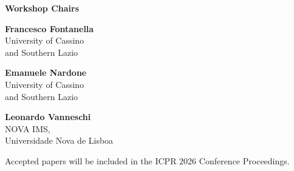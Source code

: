 \documentclass[a4paper,11pt]{article}
\begin{document}
\vspace{0.2cm}

\begin{center}
{\Large \textbf{\color{sage!60!black}Workshop Chairs}}
\end{center}
\vspace{0.2cm}

\noindent
\begin{minipage}{0.33\textwidth}
\textbf{Francesco Fontanella}\\
\small University of Cassino\\and Southern Lazio
\end{minipage}%
\begin{minipage}{0.33\textwidth}
\centering
\textbf{Emanuele Nardone}\\
\small University of Cassino\\and Southern Lazio
\end{minipage}%
\begin{minipage}{0.33\textwidth}
\raggedleft
\textbf{Leonardo Vanneschi}\\
\small NOVA IMS,\\Universidade Nova de Lisboa
\end{minipage}

\vspace{0.5cm}

\begin{center}

\vspace{0.1cm}
{\tiny \color{darktext} Accepted papers will be included in the ICPR 2026 Conference Proceedings.}
\end{center}
\end{document}
